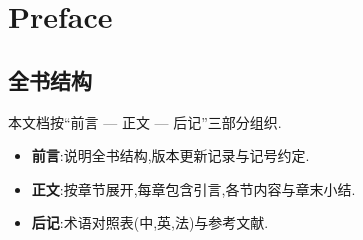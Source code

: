 \chapter*{Preface}

\section*{全书结构}
{}

本文档按``前言 — 正文 — 后记''三部分组织.

\begin{itemize}
    \item \textbf{前言}:说明全书结构,版本更新记录与记号约定.
    \item \textbf{正文}:按章节展开,每章包含引言,各节内容与章末小结.
    \item \textbf{后记}:术语对照表(中,英,法)与参考文献.
\end{itemize}
